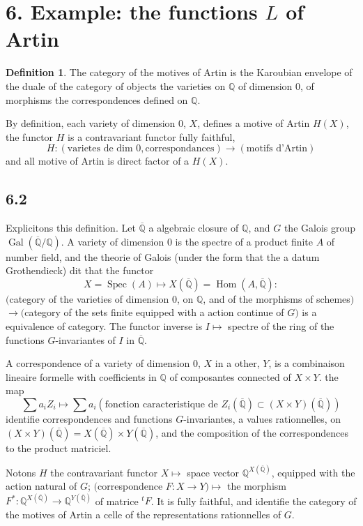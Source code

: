 \documentclass[12pt,a4paper]{article}
\theoremstyle{plain}
\theoremstyle{definition}
\newtheorem{definition}{Definition}[section]
\theoremstyle{remark}
\DeclareMathOperator{\Hom}{Hom}
\DeclareMathOperator{\Gal}{Gal}
\DeclareMathOperator{\Spec}{Spec}
\newcommand{\Q}{\mathbb{Q}}
\begin{document}
\section*{6. Example: the functions $L$ of Artin}

\begin{definition}\label{def:6.1}
The category of the motives of Artin is the Karoubian envelope of the duale of the
category of objects the varieties on $\Q$ of dimension 0, of morphisms the
correspondences defined on $\Q$.
\end{definition}

By definition, each variety of dimension 0, $X$, defines a motive of Artin
$H(X)$, the functor $H$ is a contravariant functor fully faithful,
\[
H: (\text{varietes de dim } 0, \text{correspondances}) \to (\text{motifs d'Artin})
\]
and all motive of Artin is direct factor of a $H(X)$.

\subsection*{6.2}

Explicitons this definition. Let $\overline{\Q}$ a algebraic closure of $\Q$, and $G$ the
Galois group $\Gal(\overline{\Q}/\Q)$. A variety of dimension 0 is the spectre of a product
finite $A$ of number field, and the theorie of Galois (under the form that the a datum
Grothendieck) dit that the functor
\[
X = \Spec(A) \mapsto X(\overline{\Q}) = \Hom(A, \overline{\Q}):
\]
$($category of the varieties of dimension 0, on $\Q$, and of the morphisms of schemes$)$
$\to ($category of the sets finite equipped with a action continue of $G)$
is a equivalence of category. The functor inverse is $I \mapsto$ spectre of the ring
of the functions $G$-invariantes of $I$ in $\overline{\Q}$.

A correspondence of a variety of dimension 0, $X$ in a other, $Y$, is a
combinaison lineaire formelle with coefficients in $\Q$ of composantes connected of
$X \times Y$. the map
\[
\sum a_i Z_i \mapsto \sum a_i (\text{fonction caracteristique de } Z_i(\overline{\Q}) \subset (X \times Y)(\overline{\Q}))
\]
identifie correspondences and functions $G$-invariantes, a values rationnelles, on
$(X \times Y)(\overline{\Q}) = X(\overline{\Q}) \times Y(\overline{\Q})$, and the composition of the correspondences to the product
matriciel.

Notons $H$ the contravariant functor $X \mapsto$ space vector $\Q^{X(\overline{\Q})}$, equipped with the action
natural of $G$; $($correspondence $F: X \to Y) \mapsto$ the morphism
$F^*: \Q^{X(\overline{\Q})} \to \Q^{Y(\overline{\Q})}$ of matrice $^tF$. It is fully faithful, and identifie the category
of the motives of Artin a celle of the representations rationnelles of $G$.
\end{document}
